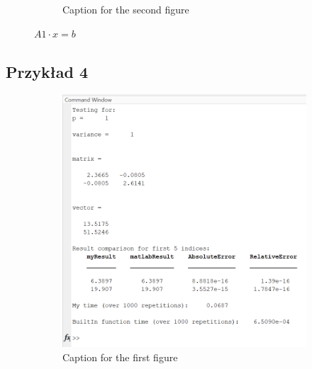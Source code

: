 \documentclass{article}
\begin{document}
\begin{figure}[hbt!]
\begin{subfigure}{0.45\linewidth}
            \caption{Caption for the second figure}
        \end{subfigure}

        \caption{$A1 \cdot x = b$}
        \label{fig:example3}
    \end{figure}
    
    \newpage
    \subsection*{Przykład 4}
    \vspace{12pt}
    \begin{figure}[hbt!]
        \centering

        \begin{subfigure}{0.45\linewidth}
            \includegraphics[width=\linewidth]{img/fig4.png}
            \caption{Caption for the first figure}
        \end{subfigure}
        \hfill
        \begin{subfigure}{0.45\linewidth}

\end{subfigure}
\end{figure}
\end{document}
